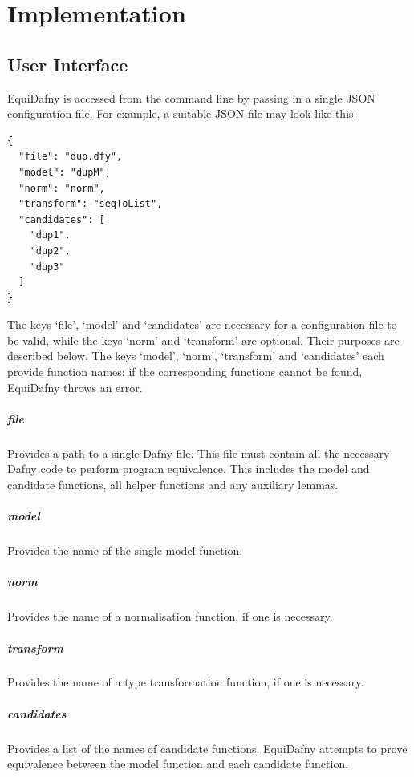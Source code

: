 \chapter{Implementation}\label{chp:implementation}

\section{User Interface}\label{sec:user-interface}
EquiDafny is accessed from the command line by passing in a single JSON configuration file. For example, a suitable JSON file may look like this:
\begin{verbatim}
{
  "file": "dup.dfy",
  "model": "dupM",
  "norm": "norm",
  "transform": "seqToList",
  "candidates": [
    "dup1",
    "dup2",
    "dup3"
  ]
}
\end{verbatim}
%
The keys `file', `model' and `candidates' are necessary for a configuration file to be valid, while the keys `norm' and `transform' are optional. Their purposes are described below. The keys `model', `norm', `transform' and `candidates' each provide function names; if the corresponding functions cannot be found, EquiDafny throws an error. 

\paragraph{file} Provides a path to a single Dafny file. This file must contain all the necessary Dafny code to perform program equivalence. This includes the model and candidate functions, all helper functions and any auxiliary lemmas.

\paragraph{model} Provides the name of the single model function.

\paragraph{norm} Provides the name of a normalisation function, if one is necessary. 

\paragraph{transform} Provides the name of a type transformation function, if one is necessary.

\paragraph{candidates} Provides a list of the names of candidate functions. EquiDafny attempts to prove equivalence between the model function and each candidate function. 

